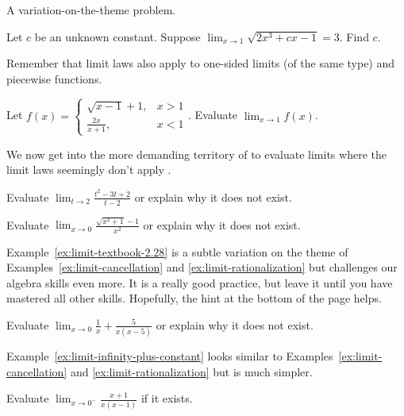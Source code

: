 \documentclass[../main.tex]{subfiles}
\begin{document}
A variation-on-the-theme problem.  
\begin{exercise}
  Let \(c\) be an unknown constant. Suppose \(\lim_{x \to 1} \sqrt{2x^{3} + cx - 1} = 3\). Find \(c\).

\end{exercise}

Remember that limit laws also apply to one-sided limits (of the same type) and piecewise functions.
\begin{example}
  Let \(f(x) = \begin{cases}\sqrt{x - 1} + 1, &x > 1\\[1ex]\frac{2x}{x + 1}, &x < 1\end{cases}\). Evaluate \(\lim_{x \to 1} f(x)\).

\end{example}

\clearpage
We now get into the more demanding territory of  to evaluate limits where the limit laws seemingly don't apply .

\begin{example} \label{ex:limit-cancellation}
  Evaluate \(\lim_{t \to 2} \frac{t^{2} - 3t + 2}{t - 2}\) or explain why it does not exist.

\end{example}

\begin{example} \label{ex:limit-rationalization}
  Evaluate \(\lim_{x \to 0} \frac{\sqrt{x^{2}+1}-1}{x^{2}}\) or explain why it does not exist.

\end{example}
\clearpage

Example~\ref{ex:limit-textbook-2.28} is a subtle variation on the theme of Examples~\ref{ex:limit-cancellation} and \ref{ex:limit-rationalization} but challenges our algebra skills even more. It is a really good practice, but leave it until you have mastered all other skills. Hopefully, the hint at the bottom of the page helps.
\begin{exercise} \label{ex:limit-textbook-2.28}
  Evaluate \(\lim_{x \to 0} \frac{1}{x} + \frac{5}{x(x-5)}\) or explain why it does not exist.

\end{exercise}

Example~\ref{ex:limit-infinity-plus-constant} looks similar to Examples~\ref{ex:limit-cancellation} and \ref{ex:limit-rationalization} but is much simpler.
\begin{example} \label{ex:limit-infinity-plus-constant}
  Evaluate \(\lim_{x \to 0^{-}} \frac{x+1}{x(x-1)}\) if it exists.

\end{example}
\end{document}
